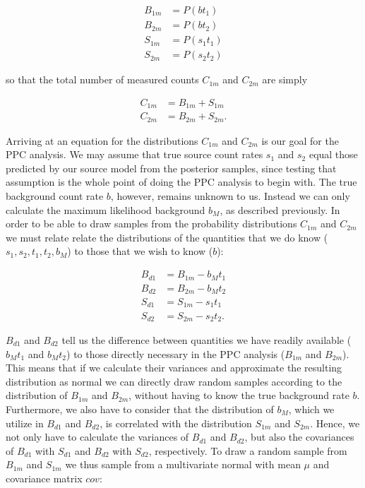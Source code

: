 \documentclass{article}
\begin{document}
\begin{align*}
    B_{1m} &= P(bt_1) \\
    B_{2m} &= P(bt_2) \\
    S_{1m} &= P(s_1t_1) \\
    S_{2m} &= P(s_2t_2)
\end{align*}

so that the total number of measured counts $C_{1m}$ and $C_{2m}$ are simply

\begin{align*}
    C_{1m} &= B_{1m} + S_{1m} \\
    C_{2m} &= B_{2m} + S_{2m}.
\end{align*}

Arriving at an equation for the distributions $C_{1m}$ and $C_{2m}$ is our goal for the PPC analysis. We may assume that true source count rates $s_1$ and $s_2$ equal those predicted by our source model from the posterior samples, since testing that assumption is the whole point of doing the PPC analysis to begin with. The true background count rate $b$, however, remains unknown to us. Instead we can only calculate the maximum likelihood background $b_M$, as described previously. In order to be able to draw samples from the probability distributions $C_{1m}$ and $C_{2m}$ we must relate relate the distributions of the quantities that we do know ($s_1, s_2, t_1, t_2, b_M$) to those that we wish to know ($b$):

\begin{align*}
    B_{d1} &= B_{1m} - b_Mt_1 \\
    B_{d2} &= B_{2m} - b_Mt_2 \\
    S_{d1} &= S_{1m} - s_1t_1 \\
    S_{d2} &= S_{2m} - s_2t_2.
\end{align*}

$B_{d1}$ and $B_{d2}$ tell us the difference between quantities we have readily available ($b_Mt_1$ and $b_Mt_2$) to those directly necessary in the PPC analysis ($B_{1m}$ and $B_{2m}$). This means that if we calculate their variances and approximate the resulting distribution as normal we can directly draw random samples according to the distribution of $B_{1m}$ and $B_{2m}$, without having to know the true background rate $b$. Furthermore, we also have to consider that the distribution of $b_M$, which we utilize in $B_{d1}$ and $B_{d2}$, is correlated with the distribution $S_{1m}$ and $S_{2m}$. Hence, we not only have to calculate the variances of $B_{d1}$ and $B_{d2}$, but also the covariances of $B_{d1}$ with $S_{d1}$ and $B_{d2}$ with $S_{d2}$, respectively. To draw a random sample from $B_{1m}$ and $S_{1m}$ we thus sample from a multivariate normal with mean $\mu$ and covariance matrix $cov$:
\end{document}

